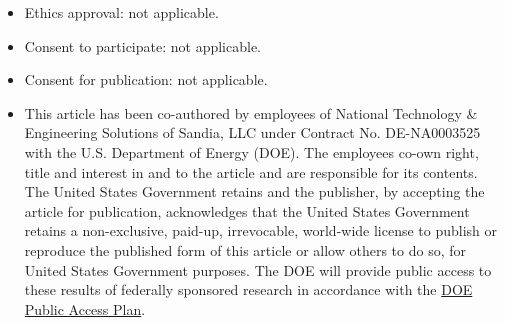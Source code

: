 \documentclass[pdflatex,sn-mathphys-num]{sn-jnl}%
\theoremstyle{thmstyleone}%
\theoremstyle{thmstyletwo}%
\theoremstyle{thmstylethree}%
\begin{document}
\begin{itemize}
    without retraining.
    The repository states which sweep backs which table, and which sweeps have been superseded and
    why; superseded results are retained rather than deleted.
    The regularization strength, the readout initialization, and the optimizer settings of the
    neural ODE experiments are selected on validation error, and each selection is recorded with
    the sweep that determined it.
    The ResNet experiments use a fork of the MATLAB Meganet library~\cite{HaberRuthotto2017}
    reduced to the components this manuscript needs; the four local modifications to it are marked
    in place. The neural ODE experiments use PyTorch with \texttt{torchdiffeq}.
    A test suite covering the basis construction, the Gram matrix, the continuous adjoint against
    backpropagation, and a Taylor convergence rate must pass before any sweep is run.

    \item Ethics approval: not applicable.
    \item Consent to participate: not applicable.
    \item Consent for publication: not applicable. 
    \item This article has been co-authored by employees of National Technology \& Engineering Solutions of Sandia, LLC under Contract No. DE-NA0003525 
with the U.S. Department of Energy (DOE). The employees co-own right, title and interest in and to the article and are responsible for its contents. 
The United States Government retains and the publisher, by accepting the article for publication, acknowledges that the United States Government 
retains a non-exclusive, paid-up, irrevocable, world-wide license to publish or reproduce the published form of this article or allow others to do so, 
for United States Government purposes. The DOE will provide public access to these results of federally sponsored research in 
accordance with the \href{https://www.energy.gov/downloads/doe-public-access-plan}{DOE Public Access Plan}. 
\end{itemize}





\newpage

\end{document}
